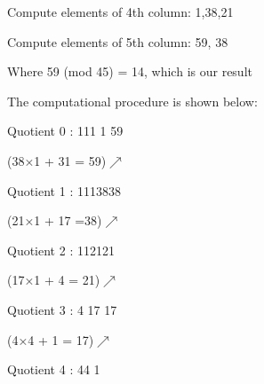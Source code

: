 \documentclass{article}
\begin{document}
Compute elements of 4th column\hspace*{4mm}:   1,\hspace*{3mm}38,\hspace*{5mm}21          

Compute elements of 5th column\hspace*{4mm}:  59, 38

Where 59 (mod 45) = 14, which is our result\newline               

The computational procedure is shown below:

\hspace*{15mm}Quotient 0   : 1\hspace*{10mm}1\hspace*{10mm}1\hspace*{10mm} 1\hspace*{10mm} 59

\hspace*{15mm}\hspace*{38mm}(38×1 + 31 =  59)$\nearrow$

\hspace*{15mm}Quotient 1   : 1\hspace*{10mm}1\hspace*{10mm}1\hspace*{10mm}38\hspace*{10mm}38 
     
\hspace*{15mm}\hspace*{25mm}(21×1 + 17 =38)$\nearrow$
 
\hspace*{15mm}Quotient 2   : 1\hspace*{10mm}1\hspace*{10mm}21\hspace*{10mm}21

\hspace*{15mm}\hspace*{15mm}(17×1 + 4 = 21)$\nearrow$
 
\hspace*{15mm}Quotient 3   : 4\hspace*{10mm} 17 \hspace*{10mm}17 

\hspace*{15mm}\hspace*{5mm}(4×4 + 1 = 17)$\nearrow$

\hspace*{15mm}Quotient 4   : 4\hspace*{10mm}4
\hspace*{15mm}\newline\newline
\hspace*{15mm}\hspace*{25mm}1 
\end{document}
